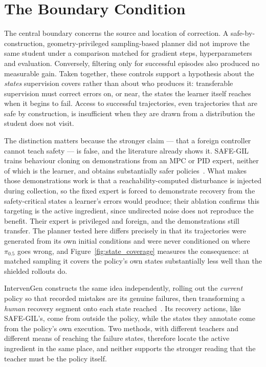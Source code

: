 \section*{The Boundary Condition}

The central boundary concerns the source and location of correction. A safe-by-construction,
geometry-privileged sampling-based planner did not improve the same student under a comparison
matched for gradient steps, hyperparameters and evaluation. Conversely, filtering only for
successful episodes also produced no measurable gain. Taken together, these controls support a
hypothesis about the \emph{states} supervision covers rather than about who produces it:
transferable supervision must correct errors on, or near, the states the learner itself reaches
when it begins to fail. Access to successful trajectories, even trajectories that are safe by
construction, is insufficient when they are drawn from a distribution the student does not visit.

The distinction matters because the stronger claim --- that a foreign controller cannot teach
safety --- is false, and the literature already shows it. SAFE-GIL trains behaviour cloning on
demonstrations from an MPC or PID expert, neither of which is the learner, and obtains
substantially safer policies~\cite{ciftci2025safegil}. What makes those demonstrations work is that
a reachability-computed disturbance is injected during collection, so the fixed expert is forced to
demonstrate recovery from the safety-critical states a learner's errors would produce; their
ablation confirms this targeting is the active ingredient, since undirected noise does not
reproduce the benefit. Their expert is privileged and foreign, and the demonstrations still
transfer. The planner tested here differs precisely in that its trajectories were generated from
its own initial conditions and were never conditioned on where $\pi_{0.5}$ goes wrong, and
Figure~\ref{fig:state_coverage} measures the consequence: at matched sampling it covers the
policy's own states substantially less well than the shielded rollouts do.

IntervenGen constructs the same idea independently, rolling out the \emph{current} policy so that
recorded mistakes are its genuine failures, then transforming a \emph{human} recovery segment onto
each state reached~\cite{hoque2024intervengen}. Its recovery actions, like SAFE-GIL's, come from
outside the policy, while the states they annotate come from the policy's own execution. Two
methods, with different teachers and different means of reaching the failure states, therefore
locate the active ingredient in the same place, and neither supports the stronger reading that the
teacher must be the policy itself.

